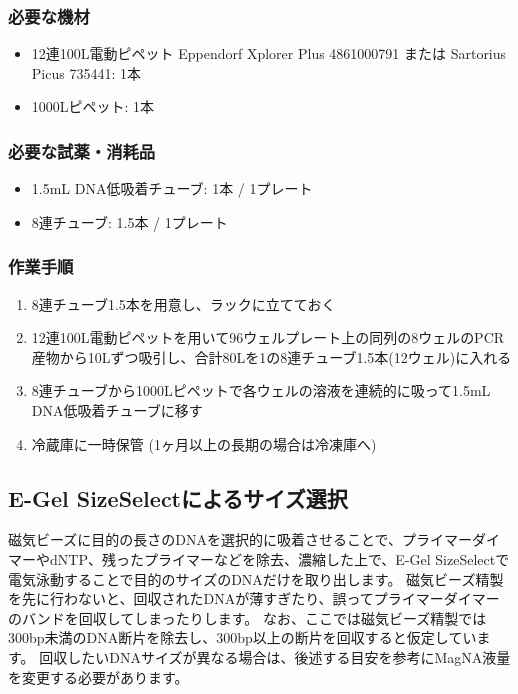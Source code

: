 \documentclass[titlepage,10pt,a4paper,uplatex]{jsbook}
\begin{document}
\subsubsection{必要な機材}
\begin{itemize}
\item 12連100{\textmu}L電動ピペット Eppendorf Xplorer Plus 4861000791 または Sartorius Picus 735441: 1本
\item 1000{\textmu}Lピペット: 1本
\end{itemize}

\subsubsection{必要な試薬・消耗品}
\begin{itemize}
\item 1.5mL DNA低吸着チューブ: 1本 / 1プレート
\item 8連チューブ: 1.5本 / 1プレート
\end{itemize}

\subsubsection{作業手順}
\begin{enumerate}
\item 8連チューブ1.5本を用意し、ラックに立てておく
\item 12連100{\textmu}L電動ピペットを用いて96ウェルプレート上の同列の8ウェルのPCR産物から10{\textmu}Lずつ吸引し、合計80{\textmu}Lを1の8連チューブ1.5本(12ウェル)に入れる
\item 8連チューブから1000{\textmu}Lピペットで各ウェルの溶液を連続的に吸って1.5mL DNA低吸着チューブに移す
\item 冷蔵庫に一時保管 (1ヶ月以上の長期の場合は冷凍庫へ)
\end{enumerate}

\subsection{E-Gel SizeSelectによるサイズ選択}

磁気ビーズに目的の長さのDNAを選択的に吸着させることで、プライマーダイマーやdNTP、残ったプライマーなどを除去、濃縮した上で、E-Gel SizeSelectで電気泳動することで目的のサイズのDNAだけを取り出します。
磁気ビーズ精製を先に行わないと、回収されたDNAが薄すぎたり、誤ってプライマーダイマーのバンドを回収してしまったりします。
なお、ここでは磁気ビーズ精製では300bp未満のDNA断片を除去し、300bp以上の断片を回収すると仮定しています。
回収したいDNAサイズが異なる場合は、後述する目安を参考にMagNA液量を変更する必要があります。
\end{document}
